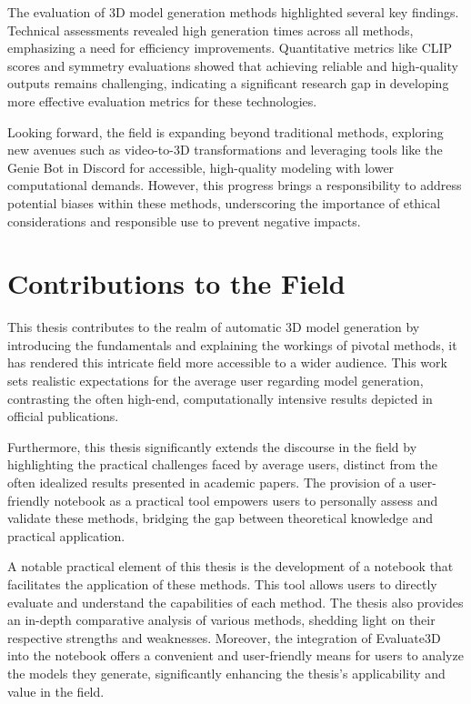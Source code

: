The evaluation of 3D model generation methods highlighted several key findings. Technical assessments revealed high generation times across all methods, emphasizing a need for efficiency improvements. Quantitative metrics like CLIP scores and symmetry evaluations showed that achieving reliable and high-quality outputs remains challenging, indicating a significant research gap in developing more effective evaluation metrics for these technologies.

Looking forward, the field is expanding beyond traditional methods, exploring new avenues such as video-to-3D transformations and leveraging tools like the Genie Bot in Discord for accessible, high-quality modeling with lower computational demands. However, this progress brings a responsibility to address potential biases within these methods, underscoring the importance of ethical considerations and responsible use to prevent negative impacts.

\section{Contributions to the Field}

This thesis contributes to the realm of automatic 3D model generation by introducing the fundamentals and explaining the workings of pivotal methods, it has rendered this intricate field more accessible to a wider audience. This work sets realistic expectations for the average user regarding model generation, contrasting the often high-end, computationally intensive results depicted in official publications.

Furthermore, this thesis significantly extends the discourse in the field by highlighting the practical challenges faced by average users, distinct from the often idealized results presented in academic papers. The provision of a user-friendly notebook as a practical tool empowers users to personally assess and validate these methods, bridging the gap between theoretical knowledge and practical application.

A notable practical element of this thesis is the development of a notebook that facilitates the application of these methods. This tool allows users to directly evaluate and understand the capabilities of each method. The thesis also provides an in-depth comparative analysis of various methods, shedding light on their respective strengths and weaknesses. Moreover, the integration of Evaluate3D into the notebook offers a convenient and user-friendly means for users to analyze the models they generate, significantly enhancing the thesis's applicability and value in the field.